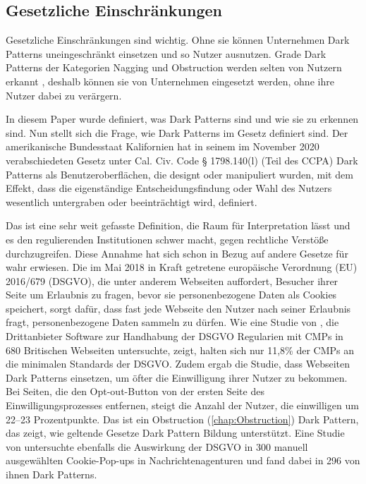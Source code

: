 \documentclass[conference,compsoc,final,a4paper]{IEEEtran}
\begin{document}



\subsection{Gesetzliche Einschränkungen}
Gesetzliche Einschränkungen sind wichtig. Ohne sie können Unternehmen Dark Patterns uneingeschränkt einsetzen und so Nutzer ausnutzen. Grade Dark Patterns der Kategorien Nagging und Obstruction werden selten von Nutzern erkannt \autocites{Gray_2018}{M.Bhoot2020}, deshalb können sie von Unternehmen eingesetzt werden, ohne ihre Nutzer dabei zu verärgern.

In diesem Paper wurde definiert, was Dark Patterns sind und wie sie zu erkennen sind. Nun stellt sich die Frage, wie Dark Patterns im Gesetz definiert sind. Der amerikanische Bundesstaat Kalifornien hat in seinem im November 2020 verabschiedeten Gesetz unter Cal. Civ. Code § 1798.140(l) (Teil des \ac{CCPA}) Dark Patterns als Benutzeroberflächen, die designt oder manipuliert wurden, mit dem Effekt, dass die eigenständige Entscheidungsfindung oder Wahl des Nutzers wesentlich untergraben oder beeinträchtigt wird, definiert.

Das ist eine sehr weit gefasste Definition, die Raum für Interpretation lässt und es den regulierenden Institutionen schwer macht, gegen rechtliche Verstöße durchzugreifen. Diese Annahme hat sich schon in Bezug auf andere Gesetze für wahr erwiesen. Die im Mai 2018 in Kraft getretene europäische Verordnung (EU) 2016/679 (\ac{DSGVO}), die unter anderem Webseiten auffordert, Besucher ihrer Seite um Erlaubnis zu fragen, bevor sie personenbezogene Daten als Cookies speichert, sorgt dafür, dass fast jede Webseite den Nutzer nach seiner Erlaubnis fragt, personenbezogene Daten sammeln zu dürfen. Wie eine Studie von \citeauthor{Nouwens2020} \autocite{Nouwens2020}, die Drittanbieter Software zur Handhabung der \ac{DSGVO} Regularien mit \acp{CMP} in 680 Britischen Webseiten untersuchte, zeigt, halten sich nur 11,8\% der \acp{CMP} an die minimalen Standards der \ac{DSGVO}. Zudem ergab die Studie, dass Webseiten Dark Patterns einsetzen, um öfter die Einwilligung ihrer Nutzer zu bekommen. Bei Seiten, die den Opt-out-Button von der ersten Seite des Einwilligungsprozesses entfernen, steigt die Anzahl der Nutzer, die einwilligen um 22–23 Prozentpunkte. Das ist ein Obstruction (\autoref{chap:Obstruction}) Dark Pattern, das zeigt, wie geltende Gesetze Dark Pattern Bildung unterstützt. Eine Studie von \citeauthor{Soe2020} \autocite{Soe2020} untersuchte ebenfalls die Auswirkung der \ac{DSGVO} in 300 manuell ausgewählten Cookie-Pop-ups in Nachrichtenagenturen und fand dabei in 296 von ihnen Dark Patterns.
\end{document}
